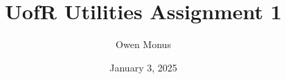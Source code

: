 \documentclass{article}
\begin{document}
\pagestyle{fancy} %

\thispagestyle{empty}
\renewcommand{\headrulewidth}{0pt} %

\title{UofR Utilities Assignment 1}
\author{Owen Monus}
\date{January 3, 2025}

\maketitle
\end{document}
